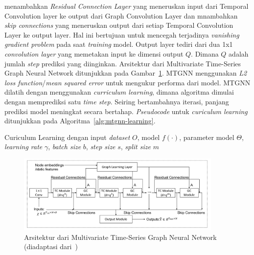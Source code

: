\cite{Wu2020} menambahkan \textit{Residual Connection Layer} yang meneruskan input dari Temporal Convolution layer ke output dari Graph Convolution Layer dan mnambahkan \textit{skip connections} yang meneruskan output dari setiap Temporal Convolution Layer ke output layer. Hal ini bertujuan untuk mencegah terjadinya \textit{vanishing gradient problem} pada saat \textit{training} model. Output layer tediri dari dua 1x1 \textit{convolution layer} yang memetakan input ke dimensi output $Q$. Dimana $Q$ adalah jumlah \textit{step} prediksi yang diinginkan. Arsitektur dari Multivariate Time-Series Graph Neural Network ditunjukkan pada Gambar~\ref{fig:mtgnn-architecture}. MTGNN menggunakan \textit{L2 loss function}/\textit{mean squared error} untuk mengukur performa dari model. MTGNN dilatih dengan menggunakan \textit{curriculum learning}, dimana algoritma dimulai dengan memprediksi satu \textit{time step}. Seiring bertambahnya iterasi, panjang prediksi model meningkat secara bertahap. \textit{Pseudocode} untuk \textit{curiculum learning} ditunjukkan pada Algoritma~\ref{alg:mtgnn-learning}.


\begin{algorithm}
\caption{Curiculum Learning dengan input \textit{dataset} $O$, model $f(\cdot)$, parameter model $\Theta$, \textit{learning rate} $\gamma$, \textit{batch size} $b$, \textit{step size} $s$, \textit{split size} $m$}
\label{alg:mtgnn-learning}
\end{algorithm}

\begin{figure}[H]
    \centering
    \includegraphics[width=0.9\textwidth]{figures/mtgnn.png}
    \caption{Arsitektur dari Multivariate Time-Series Graph Neural Network (diadaptasi dari~\cite{Wu2020})}
    \label{fig:mtgnn-architecture}
\end{figure}
